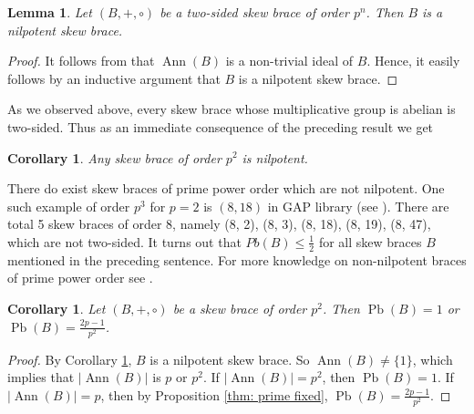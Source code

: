 \documentclass[oneside]{amsart}
\numberwithin{equation}{section}
\theoremstyle{plain}
\newtheorem{cor}[equation]{Corollary}
\newtheorem{lem}[equation]{Lemma}
\theoremstyle{definition}
\newcommand{\Pb}{\operatorname{Pb} }
\newcommand{\Ann}{\operatorname{Ann} }
\begin{document}
    


\begin{lem} \label{two-sided pn centrally nilpotent}  
    Let $(B, +, \circ)$ be a two-sided skew brace of order $p^n$. Then $B$ is a nilpotent skew brace.
\end{lem}
\begin{proof}
    It follows from \cite[Proposition 3.22]{LV23} that $\Ann(B)$ is a non-trivial ideal of $B$. Hence, it easily follows by an inductive argument that $B$ is a nilpotent skew brace.
\end{proof}

As we observed above, every skew brace whose multiplicative group is abelian is two-sided. Thus as an immediate consequence of the preceding result we get
\begin{cor}\label{p2 centrally nilpotent}
Any skew brace of order $p^2$ is nilpotent.
\end{cor}

There do exist skew braces of prime power order which are not nilpotent. One such example of order $p^3$ for $p=2$  is  $(8,18)$ in GAP library (see \cite{GAP, VK22}). There are total 5 skew braces of order 8, namely (8, 2), (8, 3), (8, 18), (8, 19), (8, 47),  which are not two-sided. It turns out that $Pb(B) \le \frac{1}{2}$ for all skew braces $B$ mentioned in the preceding sentence.  For more knowledge on non-nilpotent braces of prime power order see \cite{SM25, DP24}.

\begin{cor}
Let $(B,+, \circ)$ be a skew brace of order $p^2$. Then $\Pb(B)=1$ or $\Pb(B) =\frac{2p-1}{p^2}$.
\end{cor}
\begin{proof}
    By Corollary \ref{p2 centrally nilpotent}, $B$ is a nilpotent skew brace. So $\Ann(B)\neq\{1\}$, which implies that  $|\Ann(B)|$ is $p$ or $p^2$.  If $|\Ann(B)|=p^2$, then $\Pb(B)=1$. If $|\Ann(B)|=p$, then by Proposition \ref{thm: prime fixed}, $\Pb(B)=\frac{2p-1}{p^2}$. 
\end{proof}
\end{document}
